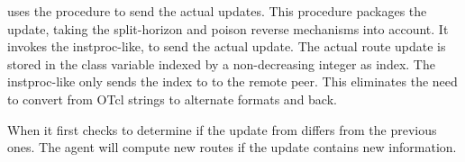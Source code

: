  uses the procedure
to send the actual updates.
This procedure packages the update, taking the
split-horizon and poison reverse mechanisms into account.
It invokes the instproc-like,
to send the actual update.
The actual route update is stored in the class variable
 indexed by a non-decreasing integer as index.
The instproc-like only sends the index to  to the remote peer.
This eliminates the need to convert from OTcl strings to alternate formats
and back.

When 
it first checks to determine if the update from differs from the previous
ones.
The agent will compute new routes if the update contains new information.


\endinput

### Local Variables:
### mode: latex
### comment-column: 60
### backup-by-copying-when-linked: t
### file-precious-flag: nil
### End:
